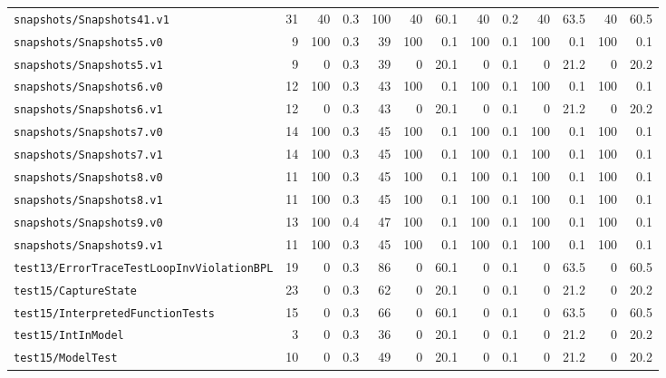 \documentclass[a4paper,final]{llncs}
\begin{document}
\begin{scriptsize}
\begin{longtable}{l |r *{1}{rr} |r *{4}{rr}}
\verb|snapshots/Snapshots41.v1|  &  31  &  40  &  0.3  &  100  &  40  &  60.1  &  40  &  0.2  &  40  &  63.5  &  40  &  60.5  \\
\verb|snapshots/Snapshots5.v0|  &  9  &  100  &  0.3  &  39  &  100  &  0.1  &  100  &  0.1  &  100  &  0.1  &  100  &  0.1  \\
\verb|snapshots/Snapshots5.v1|  &  9  &  0  &  0.3  &  39  &  0  &  20.1  &  0  &  0.1  &  0  &  21.2  &  0  &  20.2  \\
\verb|snapshots/Snapshots6.v0|  &  12  &  100  &  0.3  &  43  &  100  &  0.1  &  100  &  0.1  &  100  &  0.1  &  100  &  0.1  \\
\verb|snapshots/Snapshots6.v1|  &  12  &  0  &  0.3  &  43  &  0  &  20.1  &  0  &  0.1  &  0  &  21.2  &  0  &  20.2  \\
\verb|snapshots/Snapshots7.v0|  &  14  &  100  &  0.3  &  45  &  100  &  0.1  &  100  &  0.1  &  100  &  0.1  &  100  &  0.1  \\
\verb|snapshots/Snapshots7.v1|  &  14  &  100  &  0.3  &  45  &  100  &  0.1  &  100  &  0.1  &  100  &  0.1  &  100  &  0.1  \\
\verb|snapshots/Snapshots8.v0|  &  11  &  100  &  0.3  &  45  &  100  &  0.1  &  100  &  0.1  &  100  &  0.1  &  100  &  0.1  \\
\verb|snapshots/Snapshots8.v1|  &  11  &  100  &  0.3  &  45  &  100  &  0.1  &  100  &  0.1  &  100  &  0.1  &  100  &  0.1  \\
\verb|snapshots/Snapshots9.v0|  &  13  &  100  &  0.4  &  47  &  100  &  0.1  &  100  &  0.1  &  100  &  0.1  &  100  &  0.1  \\
\verb|snapshots/Snapshots9.v1|  &  11  &  100  &  0.3  &  45  &  100  &  0.1  &  100  &  0.1  &  100  &  0.1  &  100  &  0.1  \\
\verb|test13/ErrorTraceTestLoopInvViolationBPL|  &  19  &  0  &  0.3  &  86  &  0  &  60.1  &  0  &  0.1  &  0  &  63.5  &  0  &  60.5  \\
\verb|test15/CaptureState|  &  23  &  0  &  0.3  &  62  &  0  &  20.1  &  0  &  0.1  &  0  &  21.2  &  0  &  20.2  \\
\verb|test15/InterpretedFunctionTests|  &  15  &  0  &  0.3  &  66  &  0  &  60.1  &  0  &  0.1  &  0  &  63.5  &  0  &  60.5  \\
\verb|test15/IntInModel|  &  3  &  0  &  0.3  &  36  &  0  &  20.1  &  0  &  0.1  &  0  &  21.2  &  0  &  20.2  \\
\verb|test15/ModelTest|  &  10  &  0  &  0.3  &  49  &  0  &  20.1  &  0  &  0.1  &  0  &  21.2  &  0  &  20.2  \\

\end{longtable}
\end{scriptsize}
\end{document}
